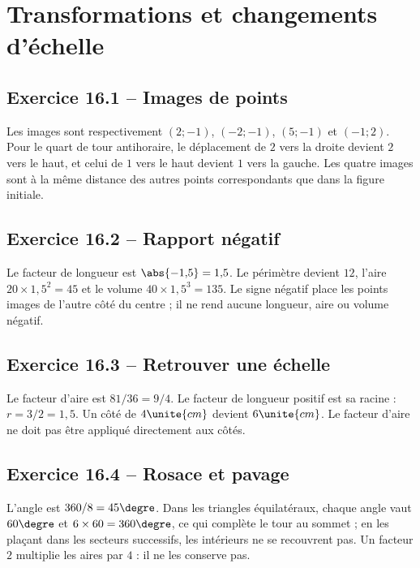 \chapter{Transformations et changements d'échelle}
\label{corriges:16}
\section*{Exercice 16.1 -- Images de points}
Les images sont respectivement $(2;-1)$, $(-2;-1)$, $(5;-1)$ et $(-1;2)$. Pour le quart de tour antihoraire, le déplacement de $2$ vers la droite devient $2$ vers le haut, et celui de $1$ vers le haut devient $1$ vers la gauche. Les quatre images sont à la même distance des autres points correspondants que dans la figure initiale.

\section*{Exercice 16.2 -- Rapport négatif}
Le facteur de longueur est $\abs{-1{,}5}=1{,}5$. Le périmètre devient $12$, l'aire $20\times1{,}5^2=45$ et le volume $40\times1{,}5^3=135$. Le signe négatif place les points images de l'autre côté du centre ; il ne rend aucune longueur, aire ou volume négatif.

\section*{Exercice 16.3 -- Retrouver une échelle}
Le facteur d'aire est $81/36=9/4$. Le facteur de longueur positif est sa racine : $r=3/2=1{,}5$. Un côté de $4\unite{cm}$ devient $6\unite{cm}$. Le facteur d'aire ne doit pas être appliqué directement aux côtés.

\section*{Exercice 16.4 -- Rosace et pavage}
L'angle est $360/8=45\degre$. Dans les triangles équilatéraux, chaque angle vaut $60\degre$ et $6\times60=360\degre$, ce qui complète le tour au sommet ; en les plaçant dans les secteurs successifs, les intérieurs ne se recouvrent pas. Un facteur $2$ multiplie les aires par $4$ : il ne les conserve pas.
